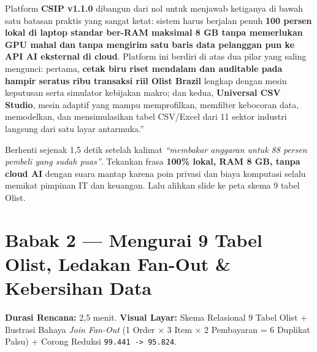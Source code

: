 \documentclass[11pt,a4paper,oneside]{book}
\newcommand{\code}[1]{{\small\nolinkurl{#1}}}
\begin{document}
\begin{scriptbox}
Platform \textbf{CSIP v1.1.0} dibangun dari nol untuk menjawab ketiganya di bawah satu batasan praktis yang sangat ketat: sistem harus berjalan penuh \textbf{100 persen lokal di laptop standar ber-RAM maksimal 8 GB tanpa memerlukan GPU mahal dan tanpa mengirim satu baris data pelanggan pun ke API AI eksternal di cloud}. Platform ini berdiri di atas dua pilar yang saling mengunci: pertama, \textbf{cetak biru riset mendalam dan auditable pada hampir seratus ribu transaksi riil Olist Brazil} lengkap dengan mesin keputusan serta simulator kebijakan makro; dan kedua, \textbf{Universal CSV Studio}, mesin adaptif yang mampu memprofilkan, memfilter kebocoran data, memodelkan, dan mensimulasikan tabel CSV/Excel dari 11 sektor industri langsung dari satu layar antarmuka.''
\end{scriptbox}

\begin{tipbox}
Berhenti sejenak 1,5 detik setelah kalimat \emph{``membakar anggaran untuk 88 persen pembeli yang sudah puas''}. Tekankan frasa \textbf{100\% lokal, RAM 8 GB, tanpa cloud AI} dengan suara mantap karena poin privasi dan biaya komputasi selalu memikat pimpinan IT dan keuangan. Lalu alihkan slide ke peta skema 9 tabel Olist.
\end{tipbox}

\section{Babak 2 --- Mengurai 9 Tabel Olist, Ledakan Fan-Out \& Kebersihan Data}

\begin{stagebox}
\textbf{Durasi Rencana:} 2,5 menit. \quad \textbf{Visual Layar:} Skema Relasional 9 Tabel Olist + Ilustrasi Bahaya \emph{Join Fan-Out} (1 Order $\times$ 3 Item $\times$ 2 Pembayaran = 6 Duplikat Palsu) + Corong Reduksi \code{99.441 -> 95.824}.
\end{stagebox}
\end{document}

